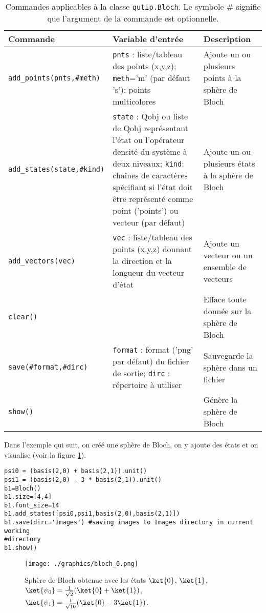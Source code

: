 \begin{table}[htpb]
\centering
\begin{tabular}{|l|p{5.5cm}|p{4.5cm}|}\hline \hline
\textbf{Commande} & \textbf{Variable d'entrée} & \textbf{Description} \\ \hline 
\hline
\texttt{add\_points(pnts,\#meth)} & \texttt{pnts} : liste/tableau des 
points (x,y,z); \texttt{meth}='m' (par défaut 's'): points multicolores & 
Ajoute un ou plusieurs points à la sphère de Bloch \\ \hline
\texttt{add\_states(state,\#kind)} & \texttt{state} : Qobj ou liste de Qobj 
représentant l'état ou l'opérateur densité du système à deux niveaux;  
\texttt{kind}: chaînes de caractères spécifiant si l'état doit 
être représenté comme point ('points') ou vecteur (par défaut)&  Ajoute un ou 
plusieurs états à la sphère de Bloch \\ \hline
\texttt{add\_vectors(vec)} & \texttt{vec} : liste/tableau des points 
(x,y,z) donnant la direction et la longueur du vecteur d'état & 
Ajoute un vecteur ou un ensemble de vecteurs \\ \hline
\texttt{clear()} & & Efface toute donnée sur la sphère de Bloch \\ \hline
\texttt{save(\#format,\#dirc)} & \texttt{format} : format ('png' par défaut) du 
fichier de sortie; \texttt{dirc} : répertoire à utiliser & Sauvegarde la sphère 
 dans un fichier \\ \hline
\texttt{show()} & & Génère la sphère de Bloch\\ \hline
\end{tabular}
\caption{Commandes applicables à la classe \texttt{qutip.Bloch}. Le symbole \# 
signifie que l'argument de la commande est optionnelle.}
\label{tab:Bloch}
\end{table}

Dans l'exemple qui suit, on créé une sphère de Bloch, on y ajoute des 
états et on visualise (voir la figure \ref{fig:bloch_0}).\\
\begin{lstlisting}[commentstyle=\scriptsize]
psi0 = (basis(2,0) + basis(2,1)).unit()
psi1 = (basis(2,0) - 3 * basis(2,1)).unit()
b1=Bloch()
b1.size=[4,4]
b1.font_size=14
b1.add_states([psi0,psi1,basis(2,0),basis(2,1)])
b1.save(dirc='Images') #saving images to Images directory in current working 
#directory
b1.show()
\end{lstlisting}
\begin{figure}[htbp]
\centering
 \texttt{[image: ./graphics/bloch\_0.png]}
 \caption{Sphère de Bloch obtenue avec les états $\ket{0}$, $\ket{1}$, 
$\ket{\psi_0}=\frac{1}{\sqrt{2}}(\ket{0}+\ket{1})$, 
$\ket{\psi_1}=\frac{1}{\sqrt{10}}(\ket{0}-3\ket{1})$.}
 \label{fig:bloch_0}
\end{figure}

